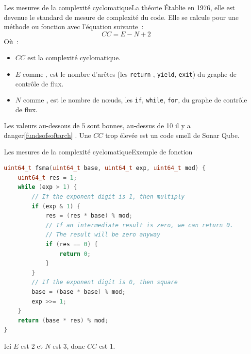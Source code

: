 \documentclass{beamer}
\begin{document}
    \begin{frame}{Les mesures de la complexité cyclomatique}{La théorie}
        Établie en 1976, elle est devenue le standard de mesure de complexité du code.
        \bigbreak
        Elle se calcule pour une méthode ou fonction avec l'équation suivante~:
        \begin{equation}
            CC = E - N + 2
        \end{equation}
        Où~:
        \begin{itemize}
            \item $CC$ est la complexité cyclomatique.
            \item $E$ comme  , est le nombre d'arêtes (les \lstinline{return} , \lstinline{yield}, \lstinline{exit}) du graphe de contrôle de flux.
            \item $N$ comme  , est le nombre de nœuds, les \lstinline{if}, \lstinline{while}, \lstinline{for}, du graphe de contrôle de flux.
        \end{itemize}
        \bigbreak
        Les valeurs au-dessous de 5 sont bonnes, au-dessus de 10 il y a danger\cref{fundsofsoftarch} .
        \bigbreak
        Une $CC$ trop élevée est un code smell de Sonar Qube.
    \end{frame}

    \begin{frame}[fragile]{Les mesures de la complexité cyclomatique}{Exemple de fonction}
        \begin{lstlisting}[language=c]
uint64_t fsma(uint64_t base, uint64_t exp, uint64_t mod) {
    uint64_t res = 1;
    while (exp > 1) {
        // If the exponent digit is 1, then multiply
        if (exp & 1) {
            res = (res * base) % mod;
            // If an intermediate result is zero, we can return 0.
            // The result will be zero anyway
            if (res == 0) {
                return 0;
            }
        }
        // If the exponent digit is 0, then square
        base = (base * base) % mod;
        exp >>= 1;
    }
    return (base * res) % mod;
}
        \end{lstlisting}

        Ici $E$ est 2 et $N$ est 3, donc $CC$ est 1.
    \end{frame}
\end{document}
